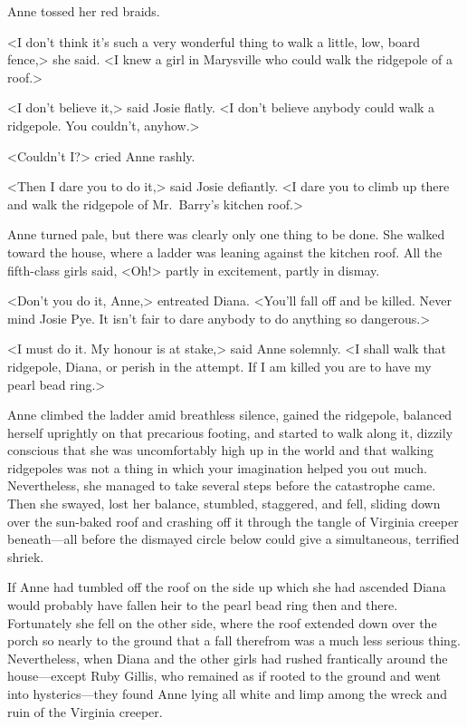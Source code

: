 Anne tossed her red braids.

<I don't think it's such a very wonderful thing to walk a little, low, board fence,> she said. <I knew a girl in Marysville who could walk the ridgepole of a roof.>

<I don't believe it,> said Josie flatly. <I don't believe anybody could walk a ridgepole. You couldn't, anyhow.>

<Couldn't I\@?> cried Anne rashly.

<Then I dare you to do it,> said Josie defiantly. <I dare you to climb up there and walk the ridgepole of Mr.~Barry's kitchen roof.>

Anne turned pale, but there was clearly only one thing to be done. She walked toward the house, where a ladder was leaning against the kitchen roof. All the fifth-class girls said, <Oh!> partly in excitement, partly in dismay.

<Don't you do it, Anne,> entreated Diana. <You'll fall off and be killed. Never mind Josie Pye. It isn't fair to dare anybody to do anything so dangerous.>

<I must do it. My honour is at stake,> said Anne solemnly. <I shall walk that ridgepole, Diana, or perish in the attempt. If I am killed you are to have my pearl bead ring.>

Anne climbed the ladder amid breathless silence, gained the ridgepole, balanced herself uprightly on that precarious footing, and started to walk along it, dizzily conscious that she was uncomfortably high up in the world and that walking ridgepoles was not a thing in which your imagination helped you out much. Nevertheless, she managed to take several steps before the catastrophe came. Then she swayed, lost her balance, stumbled, staggered, and fell, sliding down over the sun-baked roof and crashing off it through the tangle of Virginia creeper beneath—all before the dismayed circle below could give a simultaneous, terrified shriek.

If Anne had tumbled off the roof on the side up which she had ascended Diana would probably have fallen heir to the pearl bead ring then and there. Fortunately she fell on the other side, where the roof extended down over the porch so nearly to the ground that a fall therefrom was a much less serious thing. Nevertheless, when Diana and the other girls had rushed frantically around the house—except Ruby Gillis, who remained as if rooted to the ground and went into hysterics—they found Anne lying all white and limp among the wreck and ruin of the Virginia creeper.

